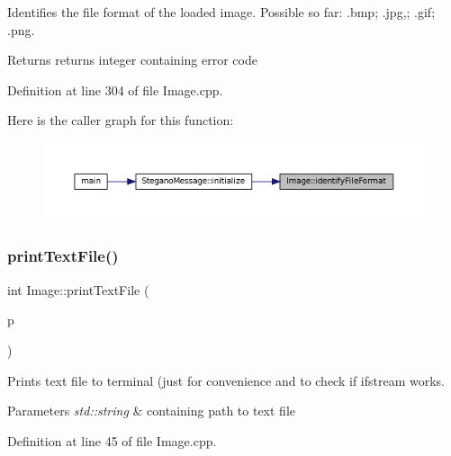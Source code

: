 Identifies the file format of the loaded image. Possible so far\+: .bmp; .jpg,; .gif; .png. 

\begin{DoxyReturn}{Returns}
returns integer containing error code 
\end{DoxyReturn}


Definition at line 304 of file Image.\+cpp.

Here is the caller graph for this function\+:
\nopagebreak
\begin{figure}[H]
\begin{center}
\leavevmode
\includegraphics[width=350pt]{classImage_ac4e8db14cfd60a6a7085e6fcb83488a4_icgraph}
\end{center}
\end{figure}
\mbox{\label{classImage_ae5daf791502caefeae1b15360d354513}} 
\subsubsection{\texorpdfstring{printTextFile()}{printTextFile()}}
{\footnotesize\ttfamily int Image\+::print\+Text\+File (\begin{DoxyParamCaption}\item[{std\+::string}]{p }\end{DoxyParamCaption})}



Prints text file to terminal (just for convenience and to check if ifstream works. 


\begin{DoxyParams}{Parameters}
{\em std\+::string} & containing path to text file \\
\hline
\end{DoxyParams}


Definition at line 45 of file Image.\+cpp.

